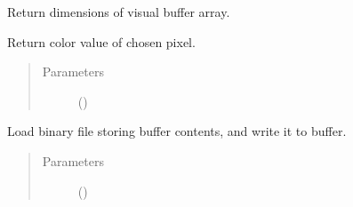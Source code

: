 \documentclass[letterpaper,10pt,english]{sphinxmanual}
\begin{document}
\begin{fulllineitems}
\begin{fulllineitems}
\begin{quote}
\begin{description}
\end{description}\end{quote}

\end{fulllineitems}


\begin{fulllineitems}
\label{\detokenize{dpav:dpav.vbuffer.VBuffer.get_dimensions}}
\sphinxAtStartPar
Return dimensions of visual buffer array.

\end{fulllineitems}


\begin{fulllineitems}
\label{\detokenize{dpav:dpav.vbuffer.VBuffer.get_pixel}}
\sphinxAtStartPar
Return color value of chosen pixel.
\begin{quote}\begin{description}
\item[{Parameters}] \leavevmode
\sphinxAtStartPar
{} () \textendash{} 

\end{description}\end{quote}

\end{fulllineitems}


\begin{fulllineitems}
\label{\detokenize{dpav:dpav.vbuffer.VBuffer.load_buffer_from_file}}
\sphinxAtStartPar
Load binary file storing buffer contents, and write it to buffer.
\begin{quote}\begin{description}
\item[{Parameters}] \leavevmode
\sphinxAtStartPar
{} () \textendash{} 


\end{description}
\end{quote}
\end{fulllineitems}
\end{fulllineitems}
\end{document}
